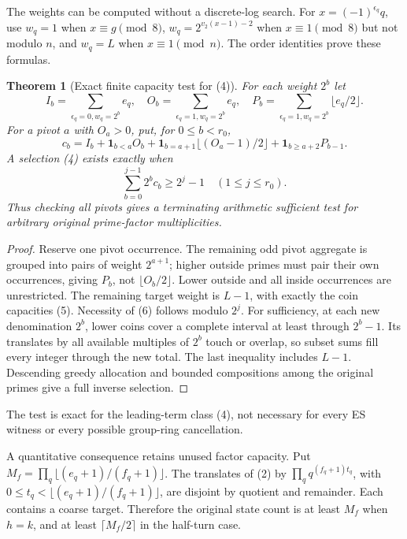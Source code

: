 \documentclass[10pt,a4paper]{article}
\newtheorem{theorem}{Theorem}
\begin{document}
The weights can be computed without a discrete-log search. For
$x=(-1)^{\epsilon_q}q$, use $w_q=1$ when $x\equiv g\pmod8$,
$w_q=2^{v_2(x-1)-2}$ when $x\equiv1\pmod8$ but not modulo $n$, and $w_q=L$
when $x\equiv1\pmod n$. The order identities prove these formulas.

\begin{theorem}[Exact finite capacity test for (4)]
For each weight $2^b$ let
\[
 I_b=\sum_{\epsilon_q=0,w_q=2^b}e_q,\quad
 O_b=\sum_{\epsilon_q=1,w_q=2^b}e_q,\quad
 P_b=\sum_{\epsilon_q=1,w_q=2^b}\lfloor e_q/2\rfloor.
\]
For a pivot $a$ with $O_a>0$, put, for $0\le b<r_0$,
\[
 c_b=I_b+\mathbf1_{b<a}O_b
 +\mathbf1_{b=a+1}\lfloor(O_a-1)/2\rfloor
 +\mathbf1_{b\ge a+2}P_{b-1}.                               \tag{5}
\]
A selection (4) exists exactly when
\[
 \boxed{\sum_{b=0}^{j-1}2^bc_b\ge2^j-1\quad(1\le j\le r_0).} \tag{6}
\]
Thus checking all pivots gives a terminating arithmetic sufficient test for
arbitrary original prime-factor multiplicities.
\end{theorem}
\begin{proof}
Reserve one pivot occurrence. The remaining odd pivot aggregate is grouped
into pairs of weight $2^{a+1}$; higher outside primes must pair their own
occurrences, giving $P_b$, not $\lfloor O_b/2\rfloor$. Lower outside and all
inside occurrences are unrestricted. The remaining target weight is $L-1$,
with exactly the coin capacities (5). Necessity of (6) follows modulo $2^j$.
For sufficiency, at each new denomination $2^b$, lower coins cover a complete
interval at least through $2^b-1$. Its translates by all available multiples
of $2^b$ touch or overlap, so subset sums fill every integer through the new
total. The last inequality includes $L-1$. Descending greedy allocation and
bounded compositions among the original primes give a full inverse selection.
\end{proof}
The test is exact for the leading-term class (4), not necessary for every ES
witness or every possible group-ring cancellation.

A quantitative consequence retains unused factor capacity. Put
$M_f=\prod_q\lfloor(e_q+1)/(f_q+1)\rfloor$. The translates of (2) by
$\prod_q q^{(f_q+1)t_q}$, with $0\le t_q<\lfloor(e_q+1)/(f_q+1)\rfloor$,
are disjoint by quotient and remainder. Each contains a coarse target.
Therefore the original state count is at least $M_f$ when $h=k$, and at
least $\lceil M_f/2\rceil$ in the half-turn case.

\newpage
\end{document}
